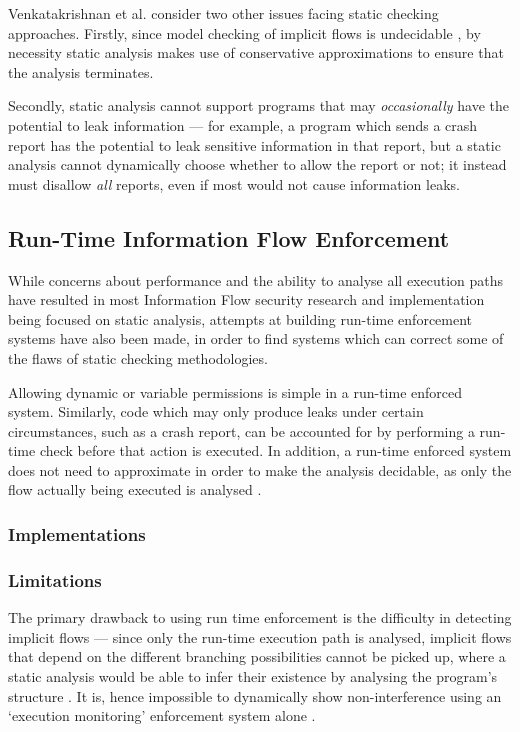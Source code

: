 Venkatakrishnan et al. \cite{venkatakrishnan2006runtime} consider two other issues facing static checking approaches. Firstly, since model checking of implicit flows is undecidable \cite{landi1992undecidability}, by necessity static analysis makes use of conservative approximations to ensure that the analysis terminates.

Secondly, static analysis cannot support programs that may \textit{occasionally} have the potential to leak information \cite{venkatakrishnan2006runtime} --- for example, a program which sends a crash report has the potential to leak sensitive information in that report, but a static analysis cannot dynamically choose whether to allow the report or not; it instead must disallow \textit{all} reports, even if most would not cause information leaks.

\subsection{Run-Time Information Flow Enforcement}

While concerns about performance and the ability to analyse all execution paths have resulted in most Information Flow security research and implementation being focused on static analysis, attempts at building run-time enforcement systems have also been made, in order to find systems which can correct some of the flaws of static checking methodologies.

Allowing dynamic or variable permissions is simple in a run-time enforced system. Similarly, code which may only produce leaks under certain circumstances, such as a crash report, can be accounted for by performing a run-time check before that action is executed. In addition, a run-time enforced system does not need to approximate in order to make the analysis decidable, as only the flow actually being executed is analysed \cite{venkatakrishnan2006runtime}.

\subsubsection{Implementations}

\subsubsection{Limitations}

The primary drawback to using run time enforcement is the difficulty in detecting implicit flows \cite{sabelfeld2003if} --- since only the run-time execution path is analysed, implicit flows that depend on the different branching possibilities cannot be picked up, where a static analysis would be able to infer their existence by analysing the program's structure \cite{venkatakrishnan2006runtime}. It is, hence impossible to dynamically show non-interference using an `execution monitoring' enforcement system alone \cite{schneider2000executionmonitoring}.

